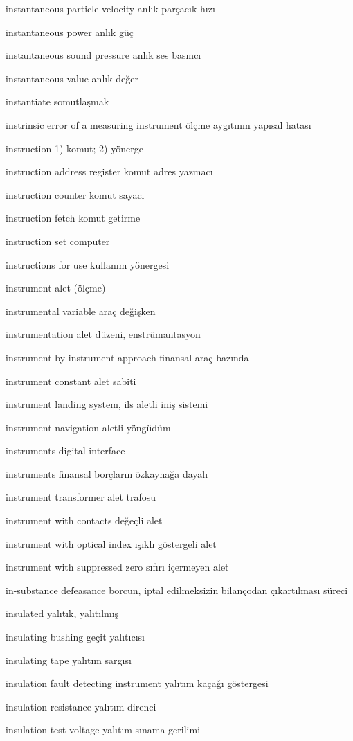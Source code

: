 \documentclass[12pt,fleqn]{article}\usepackage{../../common}
\begin{document}
instantaneous particle velocity anlık parçacık hızı

instantaneous power anlık güç

instantaneous sound pressure anlık ses basıncı

instantaneous value anlık değer

instantiate somutlaşmak

instrinsic error of a measuring instrument ölçme aygıtının yapısal hatası

instruction 1) komut; 2) yönerge

instruction address register komut adres yazmacı

instruction counter komut sayacı

instruction fetch komut getirme

instruction set computer

instructions for use kullanım yönergesi

instrument alet (ölçme)

instrumental variable araç değişken

instrumentation alet düzeni, enstrümantasyon

instrument-by-instrument approach finansal araç bazında

instrument constant alet sabiti

instrument landing system, ils aletli iniş sistemi

instrument navigation aletli yöngüdüm

instruments digital interface

instruments finansal borçların özkaynağa dayalı

instrument transformer alet trafosu

instrument with contacts değeçli alet

instrument with optical index ışıklı göstergeli alet

instrument with suppressed zero sıfırı içermeyen alet

in-substance defeasance borcun, iptal edilmeksizin bilançodan çıkartılması süreci

insulated yalıtık, yalıtılmış

insulating bushing geçit yalıtıcısı

insulating tape yalıtım sargısı

insulation fault detecting instrument yalıtım kaçağı göstergesi

insulation resistance yalıtım direnci

insulation test voltage yalıtım sınama gerilimi
\end{document}
